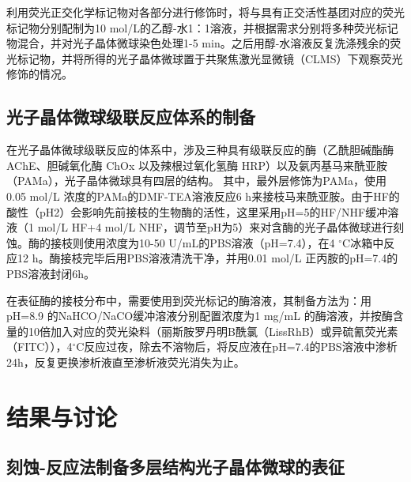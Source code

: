 利用荧光正交化学标记物对各部分进行修饰时，将与具有正交活性基团对应的荧光标记物分别配制为10 mol/L的乙醇-水1：1溶液，并根据需求分别将多种荧光标记物混合，并对光子晶体微球染色处理1-5 min。之后用醇-水溶液反复洗涤残余的荧光标记物，并将所得的光子晶体微球置于共聚焦激光显微镜（CLMS）下观察荧光修饰的情况。

\subsection{光子晶体微球级联反应体系的制备}

在光子晶体微球级联反应的体系中，涉及三种具有级联反应的酶（乙酰胆碱酯酶 AChE、胆碱氧化酶 ChOx 以及辣根过氧化氢酶 HRP）以及氨丙基马来酰亚胺（PAMa），光子晶体微球具有四层的结构。
其中，最外层修饰为PAMa，使用0.05 mol/L 浓度的PAMa的DMF-TEA溶液反应6 h来接枝马来酰亚胺。由于HF的酸性（pH\text{$\approx$}2）会影响先前接枝的生物酶的活性，这里采用pH=5的HF/NHF缓冲溶液\cite{Yu2005Mesoporous}（1 mol/L HF+4 mol/L NHF，调节至pH为5）来对含酶的光子晶体微球进行刻蚀。酶的接枝则使用浓度为10-50 U/mL的PBS溶液（pH=7.4），在4 $^{\circ}$C冰箱中反应12 h。酶接枝完毕后用PBS溶液清洗干净，并用0.01 mol/L 正丙胺的pH=7.4的PBS溶液封闭6h。

在表征酶的接枝分布中，需要使用到荧光标记的酶溶液，其制备方法为：用pH=8.9 的NaHCO/NaCO缓冲溶液分别配置浓度为1 mg/mL 的酶溶液，并按酶含量的10倍加入对应的荧光染料（丽斯胺罗丹明B酰氯（LissRhB）或异硫氰荧光素（FITC）），4$^{\circ}$C反应过夜，除去不溶物后，将反应液在pH=7.4的PBS溶液中渗析24h，反复更换渗析液直至渗析液荧光消失为止。

\section{结果与讨论}
\subsection{刻蚀-反应法制备多层结构光子晶体微球的表征}

